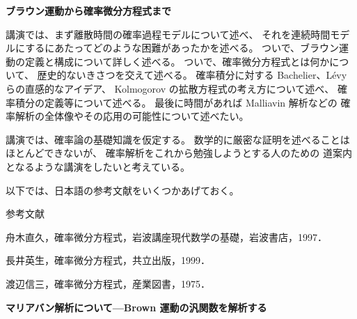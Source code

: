 \documentclass[uplatex,dvipdfmx]{jlreq}
\begin{document}
\begin{center}
{\Large\bfseries ブラウン運動から確率微分方程式まで}

\hspace*{\fill}{\large\bfseries 楠岡 成雄（東大・数理）}
\end{center}

\bigskip

講演では、まず離散時間の確率過程モデルについて述べ、
それを連続時間モデルにするにあたってどのような困難があったかを述べる。
ついで、ブラウン運動の定義と構成について詳しく述べる。
ついで、確率微分方程式とは何かについて、
歴史的ないきさつを交えて述べる。
確率積分に対する Bachelier、Lévy らの直感的なアイデア、
Kolmogorov の拡散方程式の考え方について述べ、
確率積分の定義等について述べる。
最後に時間があれば
Malliavin 解析などの
確率解析の全体像やその応用の可能性について述べたい。

講演では、確率論の基礎知識を仮定する。
数学的に厳密な証明を述べることはほとんどできないが、
確率解析をこれから勉強しようとする人のための
道案内となるような講演をしたいと考えている。

以下では、日本語の参考文献をいくつかあげておく。

\begin{center}\textsc{参考文献}\end{center}

\begin{enumerate}[{[1]}]
  \setlength{\itemsep}{2pt}
  \item[{[1]}] 舟木直久，確率微分方程式，岩波講座現代数学の基礎，岩波書店，1997．
  \item[{[2]}] 長井英生，確率微分方程式，共立出版，1999．
  \item[{[3]}] 渡辺信三，確率微分方程式，産業図書，1975．
\end{enumerate}

\newpage

\begin{center}
{\Large\bfseries マリアバン解析について---Brown 運動の汎関数を解析する}

\hspace*{\fill}{\large\bfseries 重川 一郎（京都大学大学院理学研究科）}
\end{center}
\end{document}
